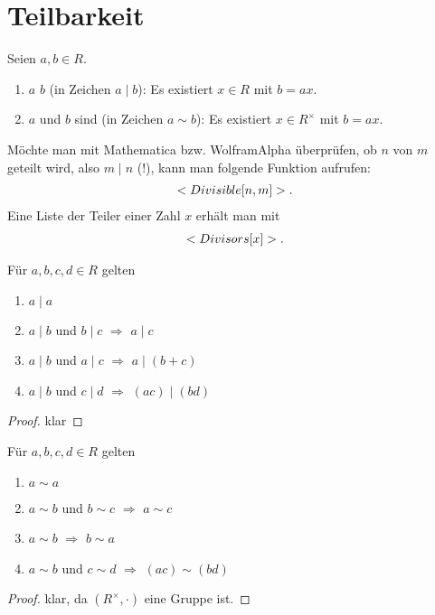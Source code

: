 \section{Teilbarkeit}

\begin{definition}[Teilbarkeit]
	Seien $a,b\in R$.
	\begin{enumerate}
		\item $a$  $b$ (in Zeichen $a\mid b$): Es existiert $x\in R$ mit $b=ax$.
		\item $a$ und $b$ sind  (in Zeichen $a\sim b$): Es existiert $x\in R^{\times}$ mit $b=ax$.
	\end{enumerate}
\end{definition}

\begin{mathematica}[Teiler]
	Möchte man mit Mathematica bzw. WolframAlpha überprüfen, ob $n$ von $m$ geteilt wird, also $m\mid n$ (!), kann man folgende Funktion aufrufen:
	\begin{align}
		\texttt{Divisible[n,m]}.\notag
	\end{align}
	Eine Liste der  Teiler einer Zahl $x$ erhält man mit
	\begin{align}
		\texttt{Divisors[x]}.\notag
	\end{align}
\end{mathematica}

\begin{lemma}
	Für $a,b,c,d\in R$ gelten
	\begin{enumerate}
		\item $a\mid a$
		\item $a\mid b$ und $b\mid c$ $\Rightarrow$ $a\mid c$
		\item $a\mid b$ und $a\mid c$ $\Rightarrow$ $a\mid (b+c)$
		\item $a\mid b$ und $c\mid d$ $\Rightarrow$ $(ac)\mid (bd)$
	\end{enumerate}
\end{lemma}
\begin{proof}
	klar
\end{proof}

\begin{lemma}
	Für $a,b,c,d\in R$ gelten
	\begin{enumerate}
		\item $a\sim a$
		\item $a\sim b$ und $b\sim c$ $\Rightarrow$ $a\sim c$
		\item $a\sim b$ $\Rightarrow$ $b\sim a$
		\item $a\sim b$ und $c\sim d$ $\Rightarrow$ $(ac)\sim (bd)$
	\end{enumerate}
\end{lemma}
\begin{proof}
	klar, da $(R^\times,\cdot)$ eine Gruppe ist.
\end{proof}


